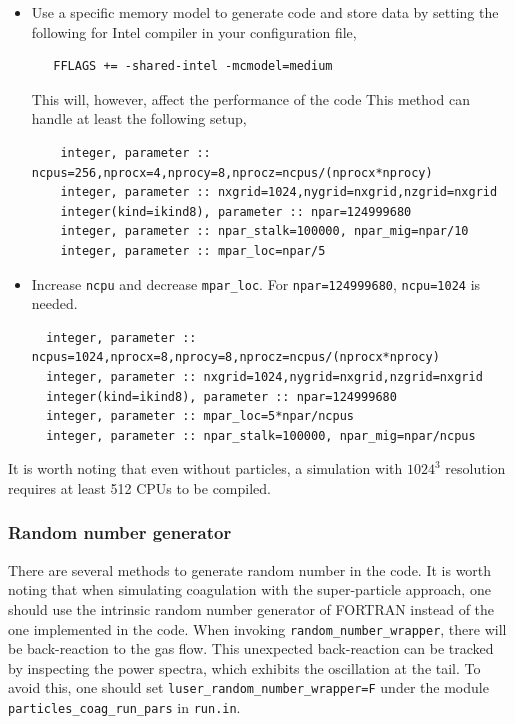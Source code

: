\documentclass[\mydriver,12pt,twoside,notitlepage,a4paper]{article}
\newcommand{\code}[1]{\texttt{#1}}
\begin{document}
\begin{itemize}
\item Use a specific memory model to generate code and store data
    by setting the following for Intel compiler in your configuration file,
  \begin{verbatim}
   FFLAGS += -shared-intel -mcmodel=medium
  \end{verbatim}
This will, however, affect the performance of the code \cite{mcmodel}
This method can handle at least the following setup, 
    \begin{verbatim}
    integer, parameter :: ncpus=256,nprocx=4,nprocy=8,nprocz=ncpus/(nprocx*nprocy)
    integer, parameter :: nxgrid=1024,nygrid=nxgrid,nzgrid=nxgrid
    integer(kind=ikind8), parameter :: npar=124999680
    integer, parameter :: npar_stalk=100000, npar_mig=npar/10
    integer, parameter :: mpar_loc=npar/5
  \end{verbatim}
\item Increase \code{ncpu} and decrease \code{mpar_loc}. For \code{npar=124999680},
\code{ncpu=1024} is needed.
  \begin{verbatim}
  integer, parameter :: ncpus=1024,nprocx=8,nprocy=8,nprocz=ncpus/(nprocx*nprocy)
  integer, parameter :: nxgrid=1024,nygrid=nxgrid,nzgrid=nxgrid
  integer(kind=ikind8), parameter :: npar=124999680
  integer, parameter :: mpar_loc=5*npar/ncpus
  integer, parameter :: npar_stalk=100000, npar_mig=npar/ncpus
  \end{verbatim}
\end{itemize}

It is worth noting that even without particles, a simulation
with $1024^3$ resolution requires at least 512 CPUs to be compiled.

\subsubsection{Random number generator}

There are several methods to generate random number in the code.
It is worth noting that when simulating coagulation with the
super-particle approach, one should use the intrinsic random number
generator of FORTRAN instead of the one implemented in the code.
When invoking \code{random_number_wrapper}, there will be back-reaction
to the gas flow. This unexpected back-reaction can be tracked by
inspecting the power spectra, which exhibits the oscillation at the tail.
To avoid this, one should set \code{luser_random_number_wrapper=F} under
the module \code{particles_coag_run_pars} in \code{run.in}.
\end{document}
